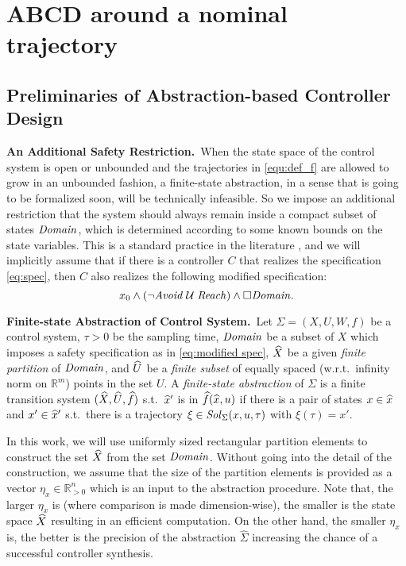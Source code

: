 
\section{ABCD around a nominal trajectory}

\subsection{Preliminaries of Abstraction-based Controller Design}

\smallskip
\noindent\textbf{An Additional Safety Restriction.}\
When the state space of the control system is open or unbounded and the trajectories in \eqref{equ:def_f} are allowed to grow in an unbounded fashion, a finite-state abstraction, in a sense that is going to be formalized soon, will be technically infeasible.
So we impose an additional restriction that the system should always remain inside a compact subset of states $\mathit{Domain}$, which is determined according to some known bounds on the state variables.
This is a standard practice in the literature \cite{reissig2016feedback}, and we will implicitly assume that if there is a controller $C$ that realizes the specification \eqref{eq:spec}, then $C$ also realizes the following modified specification:
\begin{equation}\label{eq:modified spec}
	x_0 \wedge (\lnot \mathit{Avoid} \; \mathcal{U} \; \mathit{Reach}) \wedge \square \mathit{Domain}.
\end{equation}

\smallskip
\noindent\textbf{Finite-state Abstraction of Control System.}\
Let $\Sigma = (X, U, W, f)$ be a control system, $\tau>0$ be the sampling time, $\mathit{Domain}$ be a subset of $X$ which imposes a safety specification as in \eqref{eq:modified spec}, $\widehat{X}$ be a given \emph{finite partition} of $\mathit{Domain}$, and $\widehat{U}$ be a \emph{finite subset} of equally spaced (w.r.t.\ infinity norm on $\mathbb{R}^m$) points in the set $U$.
A \emph{finite-state abstraction} of $\Sigma$ is a finite transition system $(\widehat{X},\widehat{U},\widehat{f})$ s.t.\ $\widehat{x}'$ is in $\widehat{f}(\widehat{x},u)$ if there is a pair of states $x\in \widehat{x}$ and $x'\in \widehat{x}'$ s.t.\ there is a trajectory $\xi\in \mathit{Sol}_\Sigma(x,u,\tau)$ with $\xi(\tau)=x'$.

In this work, we will use uniformly sized rectangular partition elements to construct the set $\widehat{X}$ from the set $\mathit{Domain}$.
Without going into the detail of the construction, we assume that the size of the partition elements is provided as a vector $\eta_x\in \mathbb{R}^n_{>0}$ which is an input to the abstraction procedure.
Note that, the larger $\eta_x$ is (where comparison is made dimension-wise), the smaller is the state space $\widehat{X}$ resulting in an efficient computation.
On the other hand, the smaller $\eta_x$ is, the better is the precision of the abstraction $\widehat{\Sigma}$ increasing the chance of a successful controller synthesis.

